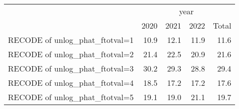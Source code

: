 \begin{tabular}{lllll}
\cline{1-5}
\multicolumn{1}{c}{} &
  \multicolumn{4}{|c}{year} \\
\multicolumn{1}{c}{} &
  \multicolumn{1}{|r}{2020} &
  \multicolumn{1}{r}{2021} &
  \multicolumn{1}{r}{2022} &
  \multicolumn{1}{r}{Total} \\
\cline{1-5}
\multicolumn{1}{l}{RECODE of unlog\_phat\_ftotval=1} &
  \multicolumn{1}{|r}{10.9} &
  \multicolumn{1}{r}{12.1} &
  \multicolumn{1}{r}{11.9} &
  \multicolumn{1}{r}{11.6} \\
\multicolumn{1}{l}{RECODE of unlog\_phat\_ftotval=2} &
  \multicolumn{1}{|r}{21.4} &
  \multicolumn{1}{r}{22.5} &
  \multicolumn{1}{r}{20.9} &
  \multicolumn{1}{r}{21.6} \\
\multicolumn{1}{l}{RECODE of unlog\_phat\_ftotval=3} &
  \multicolumn{1}{|r}{30.2} &
  \multicolumn{1}{r}{29.3} &
  \multicolumn{1}{r}{28.8} &
  \multicolumn{1}{r}{29.4} \\
\multicolumn{1}{l}{RECODE of unlog\_phat\_ftotval=4} &
  \multicolumn{1}{|r}{18.5} &
  \multicolumn{1}{r}{17.2} &
  \multicolumn{1}{r}{17.2} &
  \multicolumn{1}{r}{17.6} \\
\multicolumn{1}{l}{RECODE of unlog\_phat\_ftotval=5} &
  \multicolumn{1}{|r}{19.1} &
  \multicolumn{1}{r}{19.0} &
  \multicolumn{1}{r}{21.1} &
  \multicolumn{1}{r}{19.7} \\
\cline{1-5}
\end{tabular}
